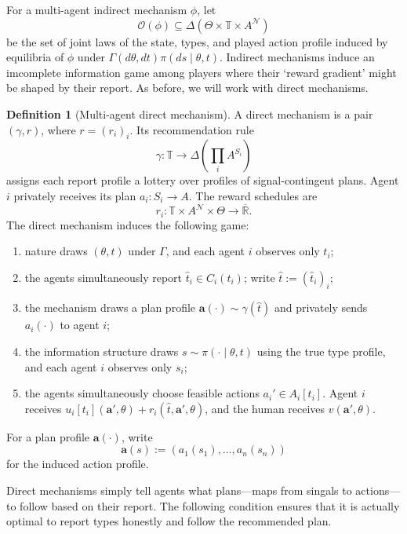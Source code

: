 \documentclass[12pt,reqno]{article}
\newcommand{\ba}{\mathbf{a}}
\newcommand{\Rbar}{\overline{\mathbb{R}}}
\theoremstyle{definition} \newtheorem{example}{Example}
\theoremstyle{definition} \newtheorem{condition}{Condition}
\theoremstyle{definition} \newtheorem{corollary}{Corollary}
\theoremstyle{definition} \newtheorem{claim}{Claim}
\theoremstyle{definition} \newtheorem{definition}{Definition}
\theoremstyle{definition} \newtheorem{conjecture}{Conjecture}
\theoremstyle{definition} \newtheorem{Lemma}{Lemma}
\theoremstyle{definition} \newtheorem{lemma}{Lemma}
\theoremstyle{plain} \newtheorem{theorem}{Theorem}
\theoremstyle{definition} \newtheorem{assumption}{Assumption}
\theoremstyle{definition} \newtheorem*{assumptionnonumber}{Assumption}
\theoremstyle{definition} \newtheorem*{theoremNoNumber}{Proposition}
\theoremstyle{definition}\newtheorem{proposition}{Proposition}
\theoremstyle{definition} \newtheorem{observation}{Observation}
\theoremstyle{definition} \newtheorem*{definitionNoNumber}{Definition}
\theoremstyle{definition} \newtheorem{Definition}{Definition}
\theoremstyle{definition} \newtheorem*{DefinitionNoNumber}{Definition}
\theoremstyle{definition} \newtheorem*{fact}{Fact}
\theoremstyle{definition} \newtheorem*{property}{Property}
\theoremstyle{definition} \newtheorem{remark}{Remark}
\theoremstyle{definition}\newtheorem{romanexampleinner}{Example}
\begin{document}
For a multi-agent indirect mechanism $\phi$, let
\[
\mathcal O(\phi)
\subseteq
\Delta\left(\Theta\times\mathbb T\times A^{\mathcal N}\right)
\]
be the set of joint laws of the state, types, and played action profile induced by equilibria of $\phi$ under $\Gamma(d\theta,dt)\pi(ds\mid\theta,t)$. Indirect mechanisms induce an imcomplete information game among players where their `reward gradient' might be shaped by their report. As before, we will work with direct mechanisms. 

\begin{definition}[Multi-agent direct mechanism]\label{def:direct-ma}
A direct mechanism is a pair $(\gamma,r)$, where $r=(r_i)_i$. Its recommendation rule
\[
\gamma:\mathbb T\to\Delta\left(\prod_i A^{S_i}\right)
\]
assigns each report profile a lottery over profiles of signal-contingent plans. Agent $i$ privately receives its plan $a_i:S_i\to A$. The reward schedules are
\[
r_i:\mathbb T\times A^{\mathcal N}\times\Theta\to\Rbar.
\]
The direct mechanism induces the following game:
\begin{enumerate}
    \item nature draws $(\theta,t)$ under $\Gamma$, and each agent $i$ observes only $t_i$;
    \item the agents simultaneously report $\hat t_i\in C_i(t_i)$; write $\hat t:=(\hat t_i)_i$;
    \item the mechanism draws a plan profile $\ba(\cdot)\sim\gamma(\hat t)$ and privately sends $a_i(\cdot)$ to agent $i$;
    \item the information structure draws $s\sim\pi(\cdot\mid\theta,t)$ using the true type profile, and each agent $i$ observes only $s_i$;
    \item the agents simultaneously choose feasible actions $a_i'\in A_i[t_i]$. Agent $i$ receives $u_i[t_i](\ba',\theta)+r_i(\hat t,\ba',\theta)$, and the human receives $v(\ba',\theta)$.
\end{enumerate}
For a plan profile $\ba(\cdot)$, write
\[
\ba(s):=(a_1(s_1),\ldots,a_n(s_n))
\]
for the induced action profile.
\end{definition}

Direct mechanisms simply tell agents what plans---maps from singals to actions---to follow based on their report. The following condition ensures that it is actually optimal to report types honestly and follow the recommended plan. 
\end{document}
